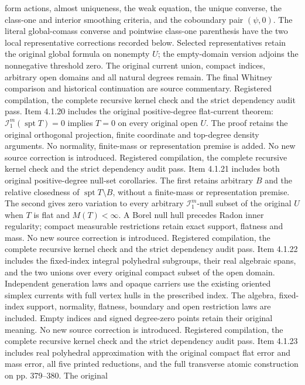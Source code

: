 \documentclass[11pt]{article}
\begin{document}
\begin{itemize}
form actions, almost uniqueness, the weak equation, the unique converse,
the class-one and interior smoothing criteria, and the coboundary pair
$(\psi,0)$. The literal global-comass converse and pointwise class-one
parenthesis have the two local representative corrections recorded below.
Selected representatives retain the original global formula on nonempty
$U$; the empty-domain version adjoins the nonnegative threshold zero.
The original current union, compact indices, arbitrary open domains and
all natural degrees remain. The final Whitney comparison and historical
continuation are source commentary. Registered compilation, the complete
recursive kernel check and the strict dependency audit pass.
Item 4.1.20 includes the original positive-degree flat-current theorem:
$\mathcal I_1^m(\operatorname{spt}T)=0$ implies $T=0$ on every original
open $U$. The proof retains the original orthogonal projection, finite
coordinate and top-degree density arguments. No normality, finite-mass or
representation premise is added. No new source correction is introduced.
Registered compilation, the complete recursive kernel check and the strict
dependency audit pass.
Item 4.1.21 includes both original positive-degree null-set corollaries.
The first retains arbitrary $B$ and the relative closedness of
$\operatorname{spt}T\setminus B$, without a finite-mass or representation
premise. The second gives zero variation to every arbitrary
$\mathcal I_1^m$-null subset of the original $U$ when $T$ is flat and
$M(T)<\infty$. A Borel null hull precedes Radon inner regularity;
compact measurable restrictions retain exact support, flatness and mass.
No new source correction is introduced. Registered compilation, the
complete recursive kernel check and the strict dependency audit pass.
Item 4.1.22 includes the fixed-index integral polyhedral subgroups,
their real algebraic spans, and the two unions over every original
compact subset of the open domain. Independent generation laws and
opaque carriers use the existing oriented simplex currents with full
vertex hulls in the prescribed index. The algebra, fixed-index support,
normality, flatness, boundary and open restriction laws are included.
Empty indices and signed degree-zero points retain their original
meaning. No new source correction is introduced. Registered compilation,
the complete recursive kernel check and the strict dependency audit pass.
Item 4.1.23 includes real polyhedral approximation with the original
compact flat error and mass error, all five printed reductions, and the
full transverse atomic construction on pp. 379--380. The original

\end{itemize}
\end{document}
